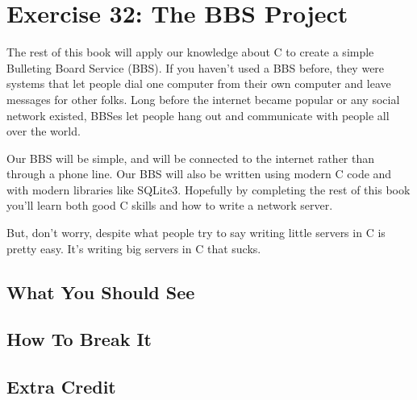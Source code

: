 \chapter{Exercise 32: The BBS Project}

The rest of this book will apply our knowledge about C to create a simple
Bulleting Board Service (BBS).  If you haven't used a BBS before, they were
systems that let people dial one computer from their own computer and leave
messages for other folks.  Long before the internet became popular or any
social network existed, BBSes let people hang out and communicate with people
all over the world.

Our BBS will be simple, and will be connected to the internet rather than
through a phone line.  Our BBS will also be written using modern C code and
with modern libraries like SQLite3.  Hopefully by completing the rest of this
book you'll learn both good C skills and how to write a network server.

But, don't worry, despite what people try to say writing little servers in C is
pretty easy.  It's writing big servers in C that sucks.

\section{What You Should See}


\section{How To Break It}


\section{Extra Credit}



